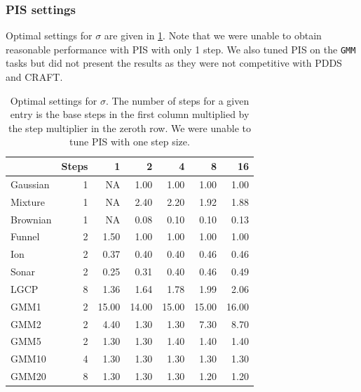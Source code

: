 \documentclass{article}
\theoremstyle{plain}
\theoremstyle{definition}
\theoremstyle{remark}
\begin{document}
\subsubsection{PIS settings}
Optimal settings for $\sigma$ are given in \cref{tab:pis_settings}. Note that we were unable to obtain reasonable performance with PIS with only 1 step. We also tuned PIS on the \verb|GMM| tasks but did not present the results as they were not competitive with PDDS and CRAFT.

\begin{table}[]
	\centering
	\begin{tabular}{lrrrrrr}
		\toprule
		         & Steps & 1     & 2     & 4     & 8     & 16    \\
		\midrule
		Gaussian & 1     & NA    & 1.00  & 1.00  & 1.00  & 1.00  \\
		Mixture  & 1     & NA    & 2.40  & 2.20  & 1.92  & 1.88  \\
		Brownian & 1     & NA    & 0.08  & 0.10  & 0.10  & 0.13  \\
		Funnel   & 2     & 1.50  & 1.00  & 1.00  & 1.00  & 1.00  \\
		Ion      & 2     & 0.37  & 0.40  & 0.40  & 0.46  & 0.46  \\
		Sonar    & 2     & 0.25  & 0.31  & 0.40  & 0.46  & 0.49  \\
		LGCP     & 8     & 1.36  & 1.64  & 1.78  & 1.99  & 2.06  \\
		GMM1     & 2     & 15.00 & 14.00 & 15.00 & 15.00 & 16.00 \\
		GMM2     & 2     & 4.40  & 1.30  & 1.30  & 7.30  & 8.70  \\
		GMM5     & 2     & 1.30  & 1.30  & 1.40  & 1.40  & 1.40  \\
		GMM10    & 4     & 1.30  & 1.30  & 1.30  & 1.30  & 1.30  \\
		GMM20    & 8     & 1.30  & 1.30  & 1.30  & 1.20  & 1.20  \\
		\bottomrule
	\end{tabular}
	\caption{Optimal settings for $\sigma$. The number of steps for a given entry is the base steps in the first column multiplied by the step multiplier in the zeroth row. We were unable to tune PIS with one step size.}
	\label{tab:pis_settings}
\end{table}
\end{document}
